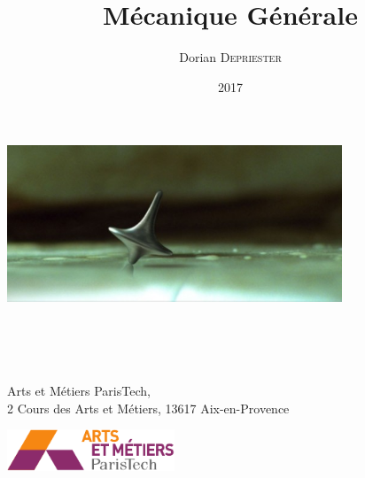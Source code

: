 \documentclass[a4paper,DIV=14,twoside,open=right,pdftex,10pt]{scrreprt}
\title{Mécanique Générale}
\date{2017}
\author{Dorian \textsc{Depriester}}
\begin{document}
\begin{titlingpage} %
	\begin{center}
		\begin{LARGE} 
			\includegraphics[width=10cm]{Spinning-top-inception}\\
			\vspace{1cm}
			\textbf{\thetitle}\\
		\end{LARGE}
		
		\vspace{3cm}
		\large{\theauthor}\\
		\thedate\\
		\begin{footnotesize}
			Arts et Métiers ParisTech,\\
			2 Cours des Arts et Métiers, 13617 Aix-en-Provence
		\end{footnotesize}
		\vfill
		\includegraphics[width=5cm]{ENSAM_logo}
	\end{center}
\end{titlingpage}

	\tableofcontents
	\printglossary[type=notation, title={Liste des symboles}, toctitle={Liste des symboles}]	
	

	
	
	
	
	
	
	
\end{document}
